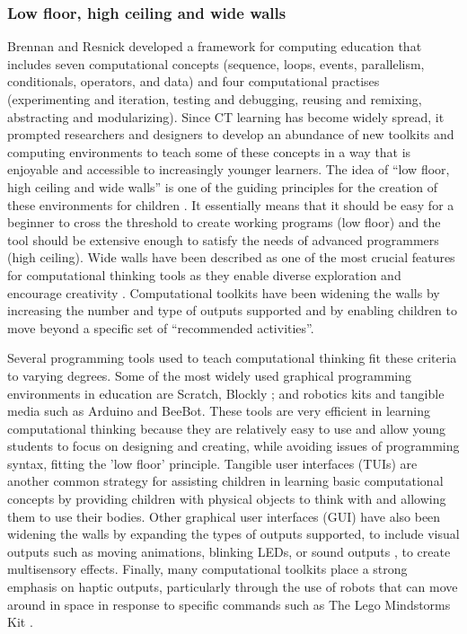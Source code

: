 \documentclass[oneside,%
                    author={Malak Hajji},
                    degree={BSc},
                    title={Designing An Accessible Ozobot Programming Platform for Students},
                  subtitle={With Mixed Visual Abilities}]{dissertation}
\begin{document}
\subsubsection{Low floor, high ceiling and wide walls}

Brennan and Resnick \cite{resnick11} developed a framework for computing education that includes seven computational concepts (sequence, loops, events, parallelism, conditionals, operators, and data) and four computational practises (experimenting and iteration, testing and debugging, reusing and remixing, abstracting and modularizing). Since CT learning has become widely spread, it prompted researchers and designers to develop an abundance of new toolkits and computing environments to teach some of these concepts in a way that is enjoyable and accessible to increasingly younger learners. The idea of “low floor, high ceiling and wide walls” is one of the guiding principles for the creation of these environments for children \cite{CB-lowfloor}. It essentially means that it should be easy for a beginner to cross the threshold to create working programs (low floor) and the tool should be extensive enough to satisfy the needs of advanced programmers (high ceiling). Wide walls have been described as one of the most crucial features for computational thinking tools as they enable diverse exploration and encourage creativity \cite{CB-lowfloor}. Computational toolkits have been widening the walls by increasing the number and type of outputs supported and by enabling children to move beyond a specific set of “recommended activities”. 

Several programming tools used to teach computational thinking fit these criteria to varying degrees. Some of the most widely used graphical programming environments in education are Scratch\cite{scratch}, Blockly \cite{blockly}; and robotics kits and tangible media such as Arduino and BeeBot. These tools are very efficient in learning computational thinking because they are relatively easy to use and allow young students to focus on designing and creating, while avoiding issues of programming syntax, fitting the 'low floor' principle. Tangible user interfaces (TUIs) are another common strategy for assisting children in learning basic computational concepts by providing children with physical objects to think with and allowing them to use their bodies. Other graphical user interfaces (GUI) have also been widening the walls by expanding the  types of outputs supported, to include visual outputs such as moving animations, blinking LEDs, or sound outputs \cite{lee}, to create multisensory effects\cite{multisensory,scratch}. Finally, many computational toolkits place a strong emphasis on haptic outputs, particularly through the use of robots that can move around in space in response to specific commands such as The Lego Mindstorms Kit \cite{lego-mindstorm}.
\end{document}
